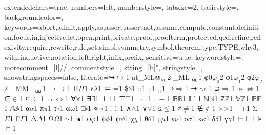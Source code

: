 {
	extendedchars=true,
	numbers=left,
	numberstyle={},
	tabsize=2,
	basicstyle={\footnotesize\sffamily\upshape}, %
	backgroundcolor=\color{white},
	keywords={abort,admit,apply,as,assert,assertnot,assume,compute,constant,definition,focus,in,injective,let,open,print,private,proof,proofterm,protected,qed,refine,reflexivity,require,rewrite,rule,set,simpl,symmetry,symbol,theorem,type,TYPE,why3,with,inductive,notation,left,right,infix,prefix},
	sensitive=true,
	keywordstyle=\color{blue},
	morecomment=[l]{//},
	commentstyle={\itshape\color{red}},
	string=[b]{"},
	stringstyle=\color{green},
	showstringspaces=false,
	literate={↪}{{{\color{blue}$\hookrightarrow$}}}1
	{at_ML}{{@${\mkern 0mu}_{{}_\mathsf{ML}}$}}2
	{_ML}{{${\mkern 5mu}_{{}_\mathsf{ML}}$}}1
	{φ0}{$\varphi_{0}$}2
	{φ1}{$\varphi_{1}$}2
	{φ2}{$\varphi_{2}$}2
	{_MM}{{${\mkern 15mu}_{{}_\mathsf{MM}}$}}1
	{→}{{{\color{blue}$\rightarrow$}}}1
	{Π}{{{\color{blue}$\Pi$}}}1
	{λ}{{{\color{blue}$\lambda$}}}1
	{≔}{{{\color{blue}:=}}}1
	{\$}{{{\color{blue}\$}}}1
	{:}{{{\color{blue}:}}}1
	{;}{{{\color{blue};}}}1
	{,}{{{\color{blue},}}}1
	{⇒}{$\Rightarrow$}1
	{⇝}{$\rightsquigarrow$}1
	{⊃}{$\Rightarrow$}1  %
	{⇔}{$\Leftrightarrow$}1
	{∈}{$\in$}1
	{⊆}{$\subseteq$}1
	{↔}{$\Leftrightarrow$}1
	{∀}{$\forall$}1
	{∃}{$\exists$}1
	{⊥}{$\bot$}1
	{⊤}{$\top$}1
	{¬}{$\neg$}1
	{≡}{$\equiv$}1
        {𝔹}{$\mathbb{B}$}1 {𝕃}{$\mathbb{L}$}1
	{ℕ}{$\mathbb{N}$}1 {ℤ}{$\mathbb{Z}$}1 {𝕍}{$\mathbb{Z}$}1
	{𝔼}{$\mathbb{E}$}1 {𝔸}{$\mathbb{A}$}1
	{α}{$\alpha$}1 {π}{$\pi$}1 {τ}{$\tau$}1 {ω}{$\omega$}1
	{□}{$\square$}1
	{⋄}{$\diamond$}1
	{⸬}{::}1
	{∧}{$\wedge$}1 {∨}{$\lor$}1
	{≤}{$\le$}1 {≠}{$\neq$}1 {∉}{$\notin$}1
	{×}{$\times$}1 {+}{+}1
	{Σ}{$\Sigma$}1
	{Γ}{$\Gamma$}1
	{Δ}{$\Delta$}1
	{Ω}{$\Omega$}1
	{⋅}{$\cdot$}1
	{∙}{$\bullet$}1
	{φ}{$\varphi$}1
	{ϕ}{$\phi$}1
	{ψ}{$\psi$}1
	{χ}{$\chi$}1
	{θ}{$\theta$}1
	{μ}{$\mu$}1
	{ν}{$\nu$}1
	{σ}{$\sigma$}1
	{κ}{$\kappa$}1
	{δ}{$\delta$}1
	{γ}{$\gamma$}1
	{⊢}{$\vdash$}1
	{⊧}{$\models$}1
}
